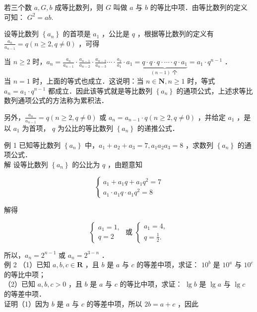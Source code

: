 \documentclass[10pt]{article}
\begin{document}
若三个数 \(a, G, b\) 成等比数列，则 \(G\) 叫做 \(a\) 与 \(b\) 的等比中项．由等比数列的定义可知： \(G^{2}=a b\).

设等比数列 \(\left\{a_{n}\right\}\) 的首项是 \(a_{1}\) ，公比是 \(q\) ，根据等比数列的定义有 \(\frac{a_{n}}{a_{n-1}}=q(n \geqslant 2, q \neq 0)\) ，可得

当 \(n \geqslant 2\) 时，\(a_{n}=\frac{a_{n}}{a_{n-1}} \cdot \frac{a_{n-1}}{a_{n-2}} \cdot \frac{a_{n-2}}{a_{n-3}} \cdots \cdot \frac{a_{2}}{a_{1}} \cdot a_{1}=\underbrace{q \cdot q \cdot q \cdot \cdots \cdot q \cdot a_{1}}_{(n-1) \text { 个 }}=a_{1} \cdot q^{n-1}\) ．\\
当 \(n=1\) 时，上面的等式也成立．这说明：当 \(n \in \mathbf{N}, n \geqslant 1\) 时，等式 \(a_{n}=a_{1} \cdot q^{n-1}\) 都成立．因此该等式就是等比数列 \(\left\{a_{n}\right\}\) 的通项公式，上述求等比数列通项公式的方法称为累积法．

另外，\(\frac{a_{n}}{a_{n-1}}=q(n \geqslant 2, q \neq 0)\) 或 \(a_{n}=a_{n-1} \cdot q(n \geqslant 2, q \neq 0)\) ，并给定 \(a_{1}\) ，是以 \(a_{1}\) 为首项， \(q\) 为公比的等比数列 \(\left\{a_{n}\right\}\) 的递推公式．

例 1 已知等比数列 \(\left\{a_{n}\right\}\) 中，\(a_{1}+a_{2}+a_{3}=7, a_{1} a_{2} a_{3}=8\) ，求数列 \(\left\{a_{n}\right\}\) 的通项公式．\\
解 设等比数列 \(\left\{a_{n}\right\}\) 的公比为 \(q\) ，由题意知

\[
\left\{\begin{array}{l}
a_{1}+a_{1} q+a_{1} q^{2}=7 \\
a_{1} \cdot a_{1} q \cdot a_{1} q^{2}=8
\end{array}\right.
\]

解得

\[
\left\{\begin{array} { l } 
{ a _ { 1 } = 1 , } \\
{ q = 2 }
\end{array} \text { 或 } \left\{\begin{array}{l}
a_{1}=4, \\
q=\frac{1}{2} .
\end{array}\right.\right.
\]

所以，\(a_{n}=2^{n-1}\) 或 \(a_{n}=2^{3-n}\) ．\\
例 2 （1）已知 \(a, b, c \in \mathbf{R}\) ，且 \(b\) 是 \(a\) 与 \(c\) 的等差中项，求证： \(10^{b}\) 是 \(10^{a}\) 与 \(10^{c}\) 的等比中项；\\
（2）已知 \(a, b, c>0\) ，且 \(b\) 是 \(a\) 与 \(c\) 的等比中项，求证： \(\lg b\) 是 \(\lg a\) 与 \(\lg c\) 的等差中项．\\
证明（1）因为 \(b\) 是 \(a\) 与 \(c\) 的等差中项，所以 \(2 b=a+c\) ，因此
\end{document}
